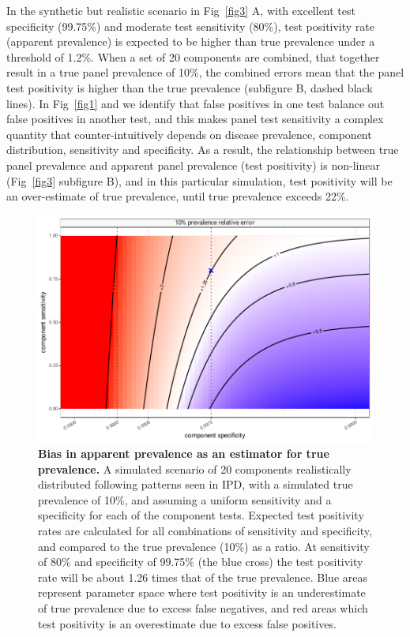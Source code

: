 \documentclass[10pt,letterpaper]{article}
\begin{document}
In the synthetic but realistic scenario in Fig~\ref{fig3} A, with excellent test specificity (99.75\%) and moderate test sensitivity (80\%), test positivity rate (apparent prevalence) is expected to be higher than true prevalence under a threshold of 1.2\%. When a set of 20 components are combined, that together result in a true panel prevalence of 10\%, the combined errors mean that the panel test positivity is higher than the true prevalence (subfigure B, dashed black lines). In Fig~\ref{fig1} and  we identify that false positives in one test balance out false positives in another test, and this makes panel test sensitivity a complex quantity that counter-intuitively depends on disease prevalence, component distribution, sensitivity and specificity. As a result, the relationship between true panel prevalence and apparent panel prevalence (test positivity) is non-linear (Fig~\ref{fig3} subfigure B), and in this particular simulation, test positivity will be an over-estimate of true prevalence, until true prevalence exceeds 22\%.
\begin{figure}[h!]
\centerline{\includegraphics{fig/impact-error-by-sensitivity-specificity.pdf}}
\caption{{\bf Bias in apparent prevalence as an estimator for true prevalence.}
A simulated scenario of 20 components realistically distributed following patterns seen in IPD, with a simulated true prevalence of 10\%, and assuming a uniform sensitivity and a specificity for each of the component tests. Expected test positivity rates are calculated for all combinations of sensitivity and specificity, and compared to the true prevalence (10\%) as a ratio. At sensitivity of 80\% and specificity of 99.75\% (the blue cross) the test positivity rate will be about 1.26 times that of the true prevalence. Blue areas represent parameter space where test positivity is an underestimate of true prevalence due to excess false negatives, and red areas which test positivity is an overestimate due to excess false positives.}
\label{fig4}
\end{figure}
\end{document}
